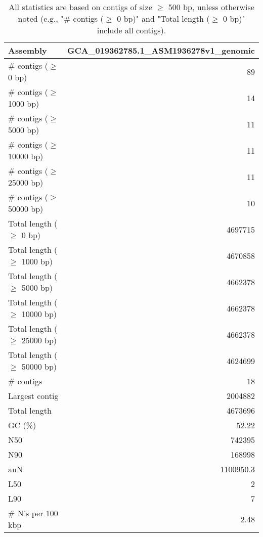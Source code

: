 \documentclass[12pt,a4paper]{article}
\begin{document}
\begin{table}[ht]
\begin{center}
\caption{All statistics are based on contigs of size $\geq$ 500 bp, unless otherwise noted (e.g., "\# contigs ($\geq$ 0 bp)" and "Total length ($\geq$ 0 bp)" include all contigs).}
\begin{tabular}{|l*{1}{|r}|}
\hline
Assembly & GCA\_019362785.1\_ASM1936278v1\_genomic \\ \hline
\# contigs ($\geq$ 0 bp) & 89 \\ \hline
\# contigs ($\geq$ 1000 bp) & 14 \\ \hline
\# contigs ($\geq$ 5000 bp) & 11 \\ \hline
\# contigs ($\geq$ 10000 bp) & 11 \\ \hline
\# contigs ($\geq$ 25000 bp) & 11 \\ \hline
\# contigs ($\geq$ 50000 bp) & 10 \\ \hline
Total length ($\geq$ 0 bp) & 4697715 \\ \hline
Total length ($\geq$ 1000 bp) & 4670858 \\ \hline
Total length ($\geq$ 5000 bp) & 4662378 \\ \hline
Total length ($\geq$ 10000 bp) & 4662378 \\ \hline
Total length ($\geq$ 25000 bp) & 4662378 \\ \hline
Total length ($\geq$ 50000 bp) & 4624699 \\ \hline
\# contigs & 18 \\ \hline
Largest contig & 2004882 \\ \hline
Total length & 4673696 \\ \hline
GC (\%) & 52.22 \\ \hline
N50 & 742395 \\ \hline
N90 & 168998 \\ \hline
auN & 1100950.3 \\ \hline
L50 & 2 \\ \hline
L90 & 7 \\ \hline
\# N's per 100 kbp & 2.48 \\ \hline
\end{tabular}
\end{center}
\end{table}
\end{document}
